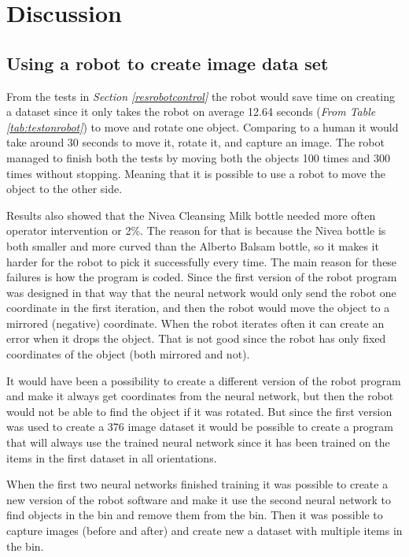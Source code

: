 \chapter{Discussion}


\section{Using a robot to create image data set}
From the tests in \textit{Section \ref{resrobotcontrol}} the robot would save time on creating a dataset since it only takes the robot on average 12.64 seconds (\textit{From Table \ref{tab:testonrobot}}) to move and rotate one object. Comparing to a human it would take around 30 seconds to move it, rotate it, and capture an image. The robot managed to finish both the tests by moving both the objects 100 times and 300 times without stopping. Meaning that it is possible to use a robot to move the object to the other side. 

Results also showed that the Nivea Cleansing Milk bottle needed more often operator intervention or 2\%. The reason for that is because the Nivea bottle is both smaller and more curved than the Alberto Balsam bottle, so it makes it harder for the robot to pick it successfully every time. The main reason for these failures is how the program is coded. Since the first version of the robot program was designed in that way that the neural network would only send the robot one coordinate in the first iteration, and then the robot would move the object to a mirrored (negative) coordinate. When the robot iterates often it can create an error when it drops the object. That is not good since the robot has only fixed coordinates of the object (both mirrored and not).

It would have been a possibility to create a different version of the robot program and make it always get coordinates from the neural network, but then the robot would not be able to find the object if it was rotated. But since the first version was used to create a 376 image dataset it would be possible to create a program that will always use the trained neural network since it has been trained on the items in the first dataset in all orientations.

When the first two neural networks finished training it was possible to create a new version of the robot software and make it use the second neural network to find objects in the bin and remove them from the bin. Then it was possible to capture images (before and after) and create new a dataset with multiple items in the bin.

